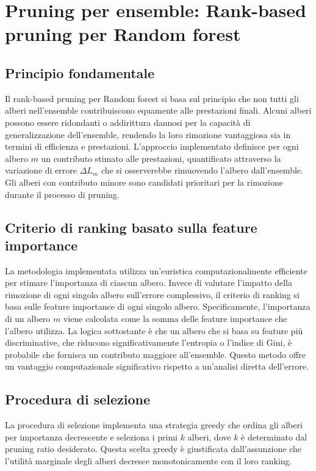\documentclass[a4paper,12pt]{report}
\begin{document}
	\section{Pruning per ensemble: Rank-based pruning per Random forest}
	
	\subsection{Principio fondamentale}
	Il rank-based pruning per Random forest si basa sul principio che non tutti gli alberi nell'ensemble contribuiscono equamente alle prestazioni finali. Alcuni alberi possono essere ridondanti o addirittura dannosi per la capacità di generalizzazione dell'ensemble, rendendo la loro rimozione vantaggiosa sia in termini di efficienza e prestazioni. L'approccio implementato definisce per ogni albero $m$ un contributo stimato alle prestazioni, quantificato attraverso la variazione di errore $\Delta L_m$ che si osserverebbe rimuovendo l'albero dall'ensemble. Gli alberi con contributo minore sono candidati prioritari per la rimozione durante il processo di pruning.
	
	\subsection{Criterio di ranking basato sulla feature importance}
	La metodologia implementata utilizza un'euristica computazionalmente efficiente per stimare l'importanza di ciascun albero. Invece di valutare l'impatto della rimozione di ogni singolo albero sull'errore complessivo, il criterio di ranking si basa sulle feature importance di ogni singolo albero. Specificamente, l'importanza di un albero $m$ viene calcolata come la somma delle feature importance che l'albero utilizza. La logica sottostante è che un albero che si basa su feature più discriminative, che riducono significativamente l'entropia o l'indice di Gini, è probabile che fornisca un contributo maggiore all'ensemble. Questo metodo offre un vantaggio computazionale significativo rispetto a un'analisi diretta dell'errore.
	
	\subsection{Procedura di selezione}
	La procedura di selezione implementa una strategia greedy che ordina gli alberi per importanza decrescente e seleziona i primi $k$ alberi, dove $k$ è determinato dal pruning ratio desiderato. Questa scelta greedy è giustificata dall'assunzione che l'utilità marginale degli alberi decresce monotonicamente con il loro ranking.
	
\end{document}
